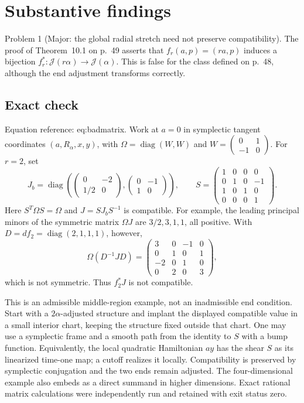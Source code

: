 \documentclass[10pt]{article}
\begin{document}
\section*{Substantive findings}
Problem 1 (Major: the global radial stretch need not preserve compatibility).  The proof of Theorem 10.1 on p. 49 asserts that \(f_r(a,p)=(ra,p)\) induces a bijection \(f_r^*:\mathcal J(r\alpha)\longrightarrow\mathcal J(\alpha)\). This is false for the class defined on p. 48, although the end adjustment transforms correctly.\par
\subsection*{Exact check}
Equation reference: eq:badmatrix. Work at \(a=0\) in symplectic tangent coordinates \((a,R_\alpha,x,y)\), with \(\Omega=\operatorname{diag}(W,W)\) and \(W=\left(\begin{smallmatrix}0&1\\-1&0\end{smallmatrix}\right)\). For \(r=2\), set \[J_b=\operatorname{diag}
 \left(\begin{pmatrix}0&-2\\1/2&0\end{pmatrix},
       \begin{pmatrix}0&-1\\1&0\end{pmatrix}\right),
 \qquad
 S=\begin{pmatrix}
 1&0&0&0\\0&1&0&-1\\1&0&1&0\\0&0&0&1
 \end{pmatrix}.\] Here \(S^T\Omega S=\Omega\) and \(J=S J_bS^{-1}\) is compatible. For example, the leading principal minors of the symmetric matrix \(\Omega J\) are \(3/2,3,1,1\), all positive. With \(D=df_2=\operatorname{diag}(2,1,1,1)\), however, \[\Omega(D^{-1}JD)=
 \begin{pmatrix}
 3&0&-1&0\\
 0&1&0&1\\
 -2&0&1&0\\
 0&2&0&3
 \end{pmatrix},
 \] which is not symmetric. Thus \(f_2^*J\) is not compatible.\par
This is an admissible middle-region example, not an inadmissible end condition. Start with a \(2\alpha\)-adjusted structure and implant the displayed compatible value in a small interior chart, keeping the structure fixed outside that chart. One may use a symplectic frame and a smooth path from the identity to \(S\) with a bump function. Equivalently, the local quadratic Hamiltonian \(a y\) has the shear \(S\) as its linearized time-one map; a cutoff realizes it locally. Compatibility is preserved by symplectic conjugation and the two ends remain adjusted. The four-dimensional example also embeds as a direct summand in higher dimensions. Exact rational matrix calculations were independently run and retained with exit status zero.\par
\end{document}
